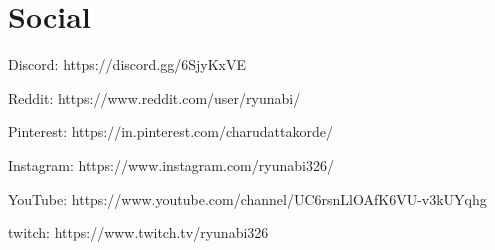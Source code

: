 \documentclass[fontsize=11pt]{tccv}
\begin{document}
\section{Social}
\begin{skills}
\item{Discord: https://discord.gg/6SjyKxVE}\\
\item{Reddit: https://www.reddit.com/user/ryunabi/}\\ 
\item {Pinterest: https://in.pinterest.com/charudattakorde/}\\
\item {Instagram: https://www.instagram.com/ryunabi326/}\\
\item {YouTube: https://www.youtube.com/channel/UC6rsnLlOAfK6VU-v3kUYqhg}\\
\item {twitch: https://www.twitch.tv/ryunabi326}\\
\end{skills}
\vspace{1em}

\end{document}
